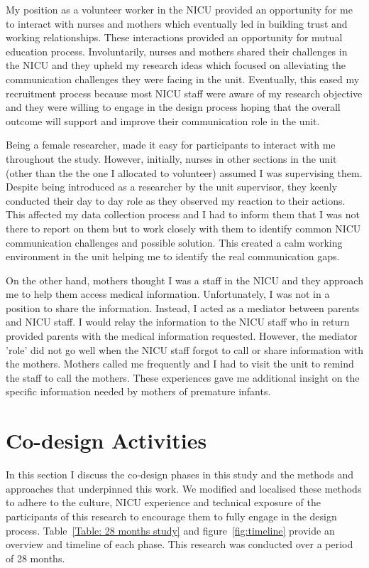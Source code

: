 My position as a volunteer worker in the NICU provided an opportunity for me to interact with nurses and mothers which eventually led in building trust and working relationships. These interactions provided an opportunity for mutual education process. Involuntarily, nurses and mothers shared their challenges in the NICU and they upheld my research ideas which focused on alleviating the communication challenges they were facing in the unit. Eventually, this eased my recruitment process because most NICU staff were aware of my research objective and they were willing to engage in the design process hoping that the overall outcome will support and improve their communication role in the unit. 

Being a female researcher, made it easy for participants to interact with me throughout the study. However, initially, nurses in other sections in the unit (other than the the one I allocated to volunteer) assumed I was supervising them.  Despite being introduced as a researcher by the  unit supervisor, they keenly conducted their day to day role as they observed my reaction to their actions. This affected my data collection process and I had to inform them that I was not there to report on them but to work closely with them to identify common NICU communication challenges and possible solution. This created a calm working environment in the unit helping me to identify the real communication gaps.

On the other hand, mothers thought I was a staff in the NICU and they approach me to help them access medical information. Unfortunately, I was not in a position to share the information. Instead, I acted as a mediator between parents and NICU staff. I would relay the information to the NICU staff who in return  provided parents with the medical information requested. However, the mediator 'role' did not go well when the NICU staff forgot to call or share information with the mothers. Mothers called me frequently and I had to visit the unit to remind the staff to call the mothers. These experiences gave me additional insight on the specific information needed by mothers of premature infants.

\section {Co-design Activities}
In this section I discuss the  co-design phases in this study and the methods and approaches that underpinned this work. We modified and localised these methods to adhere to the culture, NICU experience and technical exposure of the participants of this research to encourage them to fully engage in the design process. Table~\ref{Table: 28 months study} and figure~\ref{fig:timeline} provide an overview and timeline of each phase. This research was conducted over a period of 28 months.

